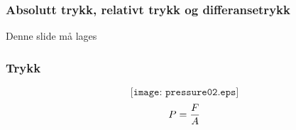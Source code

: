 \documentclass[aspectratio=169,xcolor=dvipsnames]{beamer}
\begin{document}
\begin{frame}
	\frametitle{Absolutt trykk, relativt trykk og differansetrykk}
Denne slide må lages
\end{frame}
%
%
%
%
\begin{frame}
	\frametitle{Trykk}

	$$\texttt{[image: pressure02.eps]}$$
$$P = {F \over A}$$
\end{frame}
%
%
%
%
%
%
\end{document}
